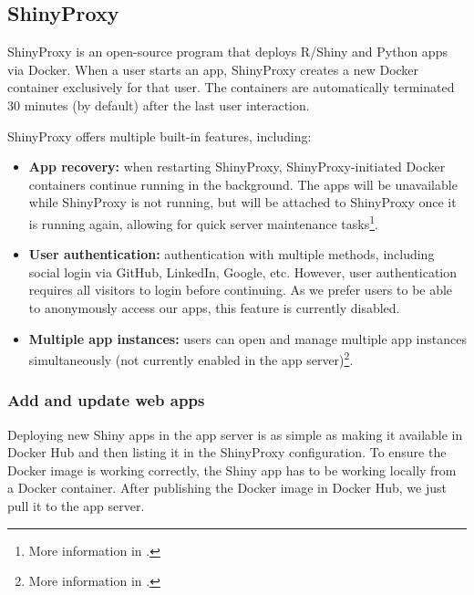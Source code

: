 \subsection{ShinyProxy}

ShinyProxy is an open-source program that deploys R/Shiny and Python apps via Docker. When a user starts an app, ShinyProxy creates a new Docker container exclusively for that user. The containers are automatically terminated 30 minutes (by default) after the last user interaction.

ShinyProxy offers multiple built-in features, including:

\begin{itemize}
    \item \textbf{App recovery:} when restarting ShinyProxy, ShinyProxy-initiated Docker containers continue running in the background. The apps will be unavailable while ShinyProxy is not running, but will be attached to ShinyProxy once it is running again, allowing for quick server maintenance tasks\footnote{More information in .}.
    \item \textbf{User authentication:} authentication with multiple methods, including social login via GitHub, LinkedIn, Google, etc. However, user authentication requires all visitors to login before continuing. As we prefer users to be able to anonymously access our apps, this feature is currently disabled.
	\item \textbf{Multiple app instances:} users can open and manage multiple app instances simultaneously (not currently enabled in the app server)\footnote{More information in .}.
\end{itemize}

\subsubsection{Add and update web apps}

Deploying new Shiny apps in the app server is as simple as making it available in Docker Hub and then listing it in the ShinyProxy configuration. To ensure the Docker image is working correctly, the Shiny app has to be working locally from a Docker container. After publishing the Docker image in Docker Hub, we just pull it to the app server.

